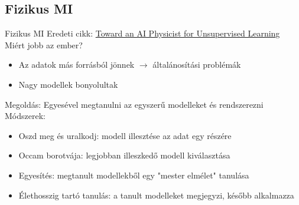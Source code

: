 \subsection{Fizikus MI}
\begin{frame}{Fizikus MI}
    Eredeti cikk: \href{https://arxiv.org/abs/1810.10525}{Toward an AI Physicist for Unsupervised Learning} \\
    Miért jobb az ember?
    \begin{itemize}
        \item Az adatok más forrásból jönnek $\rightarrow$ általánosítási problémák
        \item Nagy modellek bonyolultak
    \end{itemize}
    Megoldás: Egyesével megtanulni az egyszerű modelleket és rendszerezni \\
    Módszerek:
    \begin{itemize}
        \item Oszd meg és uralkodj: modell illesztése az adat egy részére
        \item Occam borotvája: legjobban illeszkedő modell kiválasztása
        \item Egyesítés: megtanult modellekből egy "mester elmélet" tanulása
        \item Élethosszig tartó tanulás: a tanult modelleket megjegyzi, később alkalmazza
    \end{itemize}
\end{frame}

